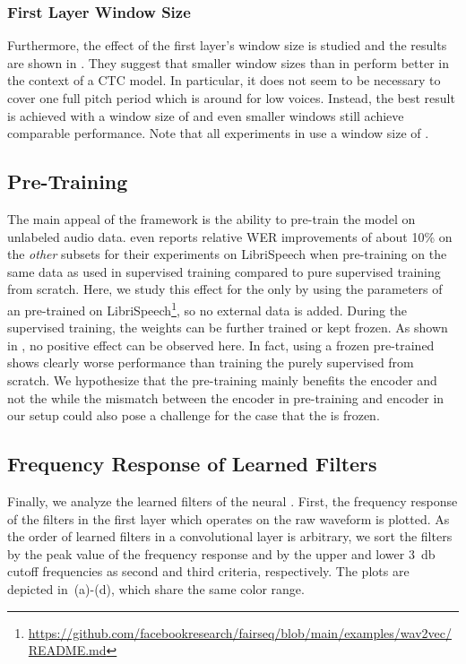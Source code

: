 \documentclass{INTERSPEECH2023}
\begin{document}
\subsubsection{First Layer Window Size}
\label{sec:scf_first_window}
Furthermore, the effect of the first layer's window size is studied and the results are shown in .
They suggest that smaller window sizes than in \cite{tuske2018:waveform} perform better in the context of a \conformer \gls{CTC} model.
In particular, it does not seem to be necessary to cover one full pitch period which is around  for low voices.
Instead, the best result is achieved with a window size of  and even smaller windows still achieve comparable performance.
Note that all experiments in  use a window size of .


\subsection{\wvtwo Pre-Training}
The main appeal of the \wvtwo framework is the ability to pre-train the model on unlabeled audio data.
\cite{facebook2020wav2vec2} even reports relative \gls{WER} improvements of about 10\% on the \textit{other} subsets for their experiments on LibriSpeech when pre-training on the same data as used in supervised training compared to pure supervised training from scratch.
Here, we study this effect for the \fe only by using the parameters of an \fe pre-trained on LibriSpeech\footnote{\raggedright\url{https://github.com/facebookresearch/fairseq/blob/main/examples/wav2vec/README.md}}, so no external data is added.
During the supervised training, the \fe weights can be further trained or kept frozen.
As shown in , no positive effect can be observed here.
In fact, using a frozen pre-trained \fe shows clearly worse performance than training the \fe purely supervised from scratch.
We hypothesize that the pre-training mainly benefits the \transformer encoder and not the \fe while the mismatch between the \transformer encoder in pre-training and \conformer encoder in our setup could also pose a challenge for the case that the \fe is frozen.


\subsection{Frequency Response of Learned Filters}
\label{sec:freq_resp}
Finally, we analyze the learned filters of the neural \fes.
First, the frequency response of the filters in the first layer which operates on the raw waveform is plotted.
As the order of learned filters in a convolutional layer is arbitrary, we sort the filters by the peak value of the frequency response and by the upper and lower \SI{3}{\decibel} cutoff frequencies as second and third criteria, respectively.
The plots are depicted in \,(a)-(d), which share the same color range.
\end{document}

